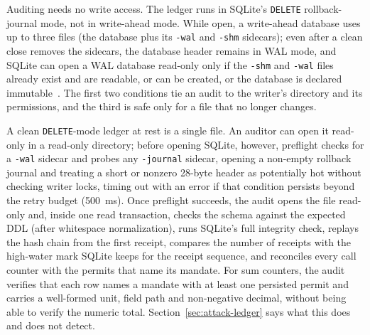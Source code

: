 \documentclass[10pt,twocolumn]{article}
\theoremstyle{plain}
\theoremstyle{definition}
\begin{document}
Auditing needs no write access. The ledger runs in SQLite's \texttt{DELETE} rollback-journal mode, not in write-ahead mode. While open, a write-ahead database uses up to three files (the database plus its \texttt{-wal} and \texttt{-shm} sidecars); even after a clean close removes the sidecars, the database header remains in WAL mode, and SQLite can open a WAL database read-only only if the \texttt{-shm} and \texttt{-wal} files already exist and are readable, or can be created, or the database is declared immutable~\cite{sqlite_wal}. The first two conditions tie an audit to the writer's directory and its permissions, and the third is safe only for a file that no longer changes.

A clean \texttt{DELETE}-mode ledger at rest is a single file. An auditor can open it read-only in a read-only directory; before opening SQLite, however, preflight checks for a \texttt{-wal} sidecar and probes any \texttt{-journal} sidecar, opening a non-empty rollback journal and treating a short or nonzero 28-byte header as potentially hot without checking writer locks, timing out with an error if that condition persists beyond the retry budget (500~ms). Once preflight succeeds, the audit opens the file read-only and, inside one read transaction, checks the schema against the expected DDL (after whitespace normalization), runs SQLite's full integrity check, replays the hash chain from the first receipt, compares the number of receipts with the high-water mark SQLite keeps for the receipt sequence, and reconciles every call counter with the permits that name its mandate. For sum counters, the audit verifies that each row names a mandate with at least one persisted permit and carries a well-formed unit, field path and non-negative decimal, without being able to verify the numeric total. Section~\ref{sec:attack-ledger} says what this does and does not detect.
\end{document}
